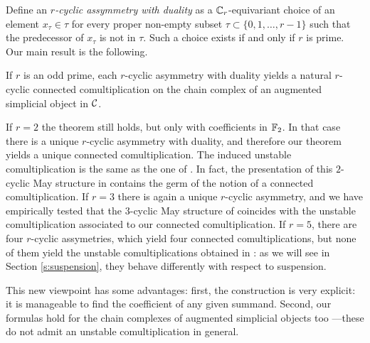 Define an \emph{$r$-cyclic assymmetry with duality} as a $\mathbb{C}_r$-equivariant choice of an element $x_\tau\in \tau$ for every proper non-empty subset $\tau\subset \{0,1,\ldots,r-1\}$ such that the predecessor of $x_\tau$ is not in $\tau$. Such a choice exists if and only if $r$ is prime. Our main result is the following.

\begin{theorem}\label{thm:main}
	If $r$ is an odd prime, each $r$-cyclic asymmetry with duality yields a natural $r$-cyclic connected comultiplication on the chain complex of an augmented simplicial object in $\mathcal{C}$.
\end{theorem}

If $r=2$ the theorem still holds, but only with coefficients in $\mathbb{F}_2$. In that case there is a unique $r$-cyclic asymmetry with duality, and therefore our theorem yields a unique connected comultiplication. The induced unstable comultiplication is the same as the one of \cite{medina2021may_st}. In fact, the presentation of this $2$-cyclic May structure in \cite{medina2021fast_sq} contains the germ of the notion of a connected comultiplication. If $r=3$ there is again a unique $r$-cyclic asymmetry, and we have empirically tested that the $3$-cyclic May structure of \cite{medina2021may_st} coincides with the unstable comultiplication associated to our connected comultiplication. If $r= 5$, there are four $r$-cyclic assymetries, which yield four connected comultiplications, but none of them yield the unstable comultiplications obtained in \cite{medina2021may_st}: as we will see in Section \ref{s:suspension}, they behave differently with respect to suspension.

This new viewpoint has some advantages: first, the construction is very explicit: it is manageable to find the coefficient of any given summand. %
Second, our formulas hold for the chain complexes of augmented simplicial objects too ---these do not admit an unstable comultiplication in general. %

